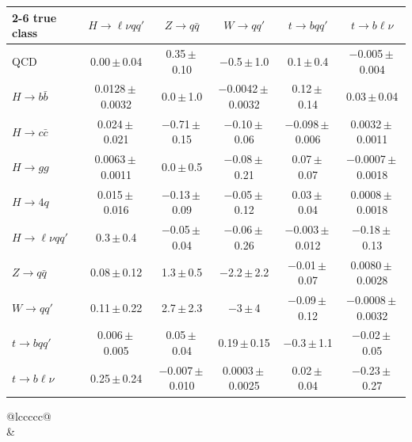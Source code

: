 \begin{landscape}
{\begin{center}
\begin{minipage}{\linewidth}
\begin{tabular*}{\linewidth}{@{\extracolsep{\fill}}lccccc@{}}
\cmidrule(lr){2-6}
true class & $H\to \ell\nu qq'$ & $Z\to q\bar q$ & $W\to qq'$ & $t\to bqq'$ & $t\to b\ell\nu$ \\
\midrule
QCD & 0.00\,$\pm$\,0.04 & 0.35\,$\pm$\,0.10 & $-$0.5\,$\pm$\,1.0 & 0.1\,$\pm$\,0.4 & $-$0.005\,$\pm$\,0.004 \\
$H\to b\bar b$ & 0.0128\,$\pm$\,0.0032 & 0.0\,$\pm$\,1.0 & $-$0.0042\,$\pm$\,0.0032 & 0.12\,$\pm$\,0.14 & 0.03\,$\pm$\,0.04 \\
$H\to c\bar c$ & 0.024\,$\pm$\,0.021 & $-$0.71\,$\pm$\,0.15 & $-$0.10\,$\pm$\,0.06 & $-$0.098\,$\pm$\,0.006 & 0.0032\,$\pm$\,0.0011 \\
$H\to gg$ & 0.0063\,$\pm$\,0.0011 & 0.0\,$\pm$\,0.5 & $-$0.08\,$\pm$\,0.21 & 0.07\,$\pm$\,0.07 & $-$0.0007\,$\pm$\,0.0018 \\
$H\to 4q$ & 0.015\,$\pm$\,0.016 & $-$0.13\,$\pm$\,0.09 & $-$0.05\,$\pm$\,0.12 & 0.03\,$\pm$\,0.04 & 0.0008\,$\pm$\,0.0018 \\
$H\to \ell\nu qq'$ & 0.3\,$\pm$\,0.4 & $-$0.05\,$\pm$\,0.04 & $-$0.06\,$\pm$\,0.26 & $-$0.003\,$\pm$\,0.012 & $-$0.18\,$\pm$\,0.13 \\
$Z\to q\bar q$ & 0.08\,$\pm$\,0.12 & 1.3\,$\pm$\,0.5 & $-$2.2\,$\pm$\,2.2 & $-$0.01\,$\pm$\,0.07 & 0.0080\,$\pm$\,0.0028 \\
$W\to qq'$ & 0.11\,$\pm$\,0.22 & 2.7\,$\pm$\,2.3 & $-$3\,$\pm$\,4 & $-$0.09\,$\pm$\,0.12 & $-$0.0008\,$\pm$\,0.0032 \\
$t\to bqq'$ & 0.006\,$\pm$\,0.005 & 0.05\,$\pm$\,0.04 & 0.19\,$\pm$\,0.15 & $-$0.3\,$\pm$\,1.1 & $-$0.02\,$\pm$\,0.05 \\
$t\to b\ell\nu$ & 0.25\,$\pm$\,0.24 & $-$0.007\,$\pm$\,0.010 & 0.0003\,$\pm$\,0.0025 & 0.02\,$\pm$\,0.04 & $-$0.23\,$\pm$\,0.27 \\
\bottomrule
\end{tabular*}
\end{minipage}
\end{center}
\newpage
\begin{center}
\begin{minipage}{\linewidth}\centering
{}
\par\smallskip
\begin{tabular*}{\linewidth}{@{\extracolsep{\fill}}lccccc@{}}
\toprule
{} \\
\midrule
 &  \\

\end{tabular*}
\end{minipage}
\end{center}}
\end{landscape}
